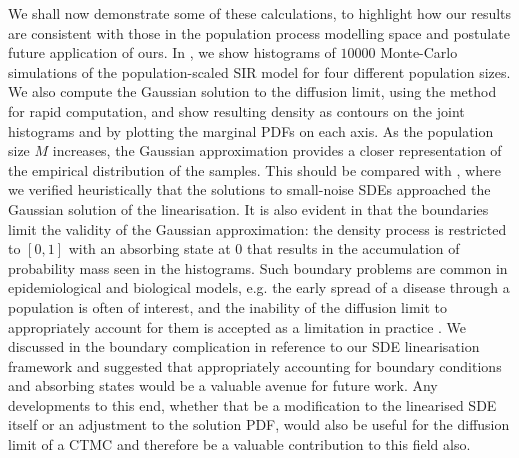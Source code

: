 We shall now demonstrate some of these calculations, to highlight how our results are consistent with those in the population process modelling space and postulate future application of ours.
In , we show histograms of \(10000\) Monte-Carlo simulations of the population-scaled SIR model for four different population sizes. We also compute the Gaussian solution to the diffusion limit, using the \citet{Mazzoni_2008_ComputationalAspectsContinuous} method for rapid computation, and show resulting density as contours on the joint histograms and by plotting the marginal PDFs on each axis.
As the population size \(M\) increases, the Gaussian approximation provides a closer representation of the empirical distribution of the samples.
This should be compared with , where we verified heuristically that the solutions to small-noise SDEs approached the Gaussian solution of the linearisation.
It is also evident in  that the boundaries limit the validity of the Gaussian approximation: the density process is restricted to \([0, 1]\) with an absorbing state at \(0\) that results in the accumulation of probability mass seen in the histograms.
Such boundary problems are common in epidemiological and biological models, e.g. the early spread of a disease through a population is often of interest, and the inability of the diffusion limit to appropriately account for them is accepted as a limitation in practice \citehere.
We discussed in  the boundary complication in reference to our SDE linearisation framework and suggested that appropriately accounting for boundary conditions and absorbing states would be a valuable avenue for future work.
Any developments to this end, whether that be a modification to the linearised SDE itself or an adjustment to the solution PDF, would also be useful for the diffusion limit of a CTMC and therefore be a valuable contribution to this field also.


